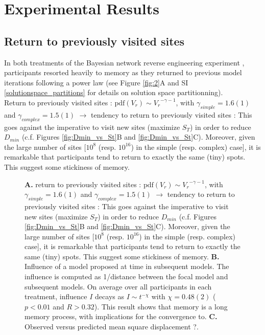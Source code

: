 \section{Experimental Results}

\subsection{Return to previously visited sites}
In both treatments of the Bayesian network reverse engineering experiment \cite{}, participants resorted heavily to memory as they returned to previous model iterations following a power law (see Figure \ref{fig:2}A and SI \ref{solutionspace_partitions} for details on solution space partitionning).\\

Return to previously visited sites : $\mathrm{pdf}(V_r) \sim {V_r}^{- \gamma -1}$, with $\gamma_{simple} = 1.6(1)$ and $\gamma_{complex} = 1.5(1)$ $\rightarrow$ tendency to return to previously visited sites : This goes against the imperative to visit new sites (maximize $S_T$) in order to reduce $D_{min}$ (c.f. Figures \ref{fig:Dmin_vs_St}B and \ref{fig:Dmin_vs_St}C). Moreover, given the large number of sites [$10^{8}$ (resp. $10^{16}$) in the simple (resp. complex) case], it is remarkable that participants tend to return to exactly the same (tiny) spots. This suggest some stickiness of memory.


\begin{figure}[h!]
\begin{center}
\caption{\footnotesize{{\bf A.} return to previously visited sites : $\mathrm{pdf}(V_r) \sim {V_r}^{- \gamma -1}$, with $\gamma_{simple} = 1.6(1)$ and $\gamma_{complex} = 1.5(1)$ $\rightarrow$ tendency to return to previously visited sites : This goes against the imperative to visit new sites (maximize $S_T$) in order to reduce $D_{min}$ (c.f. Figures \ref{fig:Dmin_vs_St}B and \ref{fig:Dmin_vs_St}C). Moreover, given the large number of sites [$10^{8}$ (resp. $10^{16}$) in the simple (resp. complex) case], it is remarkable that participants tend to return to exactly the same (tiny) spots. This suggest some stickiness of memory. {\bf B.} Influence of a model proposed at time in subsequent models. The influence is computed as 1/distance between the focal model and subsequent models. On average over all participants in each treatment, influence $I$ decays as $I \sim t^{-\chi}$ with $\chi = 0.48(2)$ ($p < 0.01$ and $R > 0.32$). This result shows that memory is a long memory process, with implications for the convergence to. {\bf C.} Observed versus predicted mean square displacement ?.}}
\label{fig:3}
\end{center}
\end{figure}

